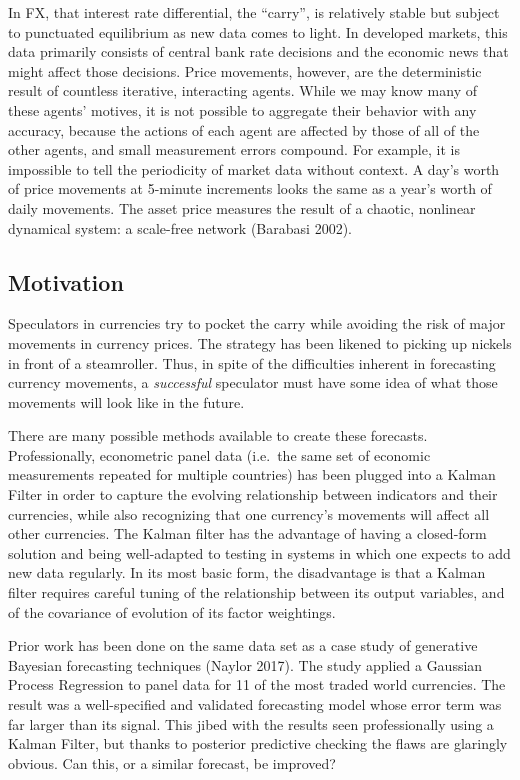 \documentclass[]{article}
\begin{document}
In FX, that interest rate differential, the ``carry'', is relatively
stable but subject to punctuated equilibrium as new data comes to light.
In developed markets, this data primarily consists of central bank rate
decisions and the economic news that might affect those decisions. Price
movements, however, are the deterministic result of countless iterative,
interacting agents. While we may know many of these agents' motives, it
is not possible to aggregate their behavior with any accuracy, because
the actions of each agent are affected by those of all of the other
agents, and small measurement errors compound. For example, it is
impossible to tell the periodicity of market data without context. A
day's worth of price movements at 5-minute increments looks the same as
a year's worth of daily movements. The asset price measures the result
of a chaotic, nonlinear dynamical system: a scale-free network (Barabasi
2002).

\subsection{Motivation}\label{motivation}

Speculators in currencies try to pocket the carry while avoiding the
risk of major movements in currency prices. The strategy has been
likened to picking up nickels in front of a steamroller. Thus, in spite
of the difficulties inherent in forecasting currency movements, a
\emph{successful} speculator must have some idea of what those movements
will look like in the future.

There are many possible methods available to create these forecasts.
Professionally, econometric panel data (i.e.~the same set of economic
measurements repeated for multiple countries) has been plugged into a
Kalman Filter in order to capture the evolving relationship between
indicators and their currencies, while also recognizing that one
currency's movements will affect all other currencies. The Kalman filter
has the advantage of having a closed-form solution and being
well-adapted to testing in systems in which one expects to add new data
regularly. In its most basic form, the disadvantage is that a Kalman
filter requires careful tuning of the relationship between its output
variables, and of the covariance of evolution of its factor weightings.

Prior work has been done on the same data set as a case study of
generative Bayesian forecasting techniques (Naylor 2017). The study
applied a Gaussian Process Regression to panel data for 11 of the most
traded world currencies. The result was a well-specified and validated
forecasting model whose error term was far larger than its signal. This
jibed with the results seen professionally using a Kalman Filter, but
thanks to posterior predictive checking the flaws are glaringly obvious.
Can this, or a similar forecast, be improved?
\end{document}
